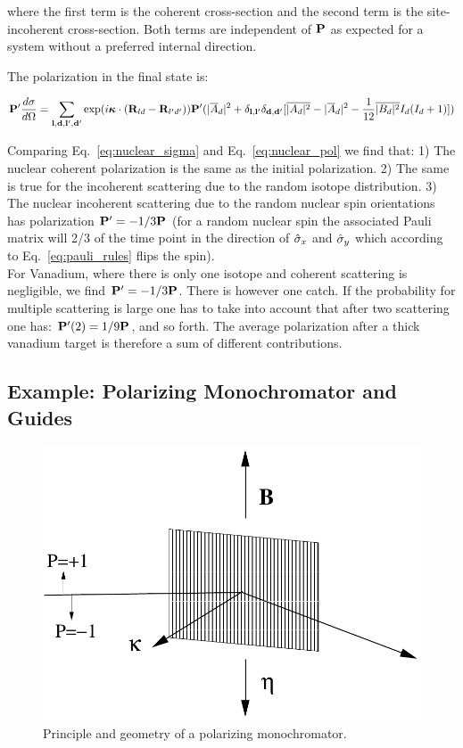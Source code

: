 where the first term is the coherent cross-section and the second term is the
site-incoherent cross-section. Both terms are independent of $\mathbf{P}$ as expected
for a system without a preferred internal direction.

The polarization in the final state is:

\begin{equation}
  \label{eq:nuclear_pol}
  \mathbf{P}' \frac{d\sigma}{d\Omega}  = 
  \sum_{\mathbf{l}, \mathbf{d}, \mathbf{l}', \mathbf{d}'} \exp(i \mathbf{\mbox{\boldmath $\kappa$}} \cdot (\mathbf{R}_{ld}-\mathbf{R}_{l'd'}))
  \mathbf{P}' (|\overline{A}_d|^2 + \delta_{\mathbf{l},\mathbf{l}'}\delta_{\mathbf{d},\mathbf{d}'}[\overline{|A_d|^2} - |\overline{A}_d|^2
  - \frac{1}{12}\overline{|B_d|^2}I_d(I_d+1)])
\end{equation}

Comparing Eq.~\ref{eq:nuclear_sigma} and Eq.~\ref{eq:nuclear_pol} we
find that: 1) The nuclear coherent polarization is the same as the
initial polarization. 2) The same is true for the incoherent
scattering due to the random isotope distribution. 3) The nuclear
incoherent scattering due to the random nuclear spin orientations has
polarization $\mathbf{P}' = -1/3 \mathbf{P}$ (for a random nuclear spin the
associated Pauli matrix will 2/3 of the time point in the direction of
$\hat{\sigma}_x$ and $\hat{\sigma}_y$ which according to
Eq.~\ref{eq:pauli_rules} flips the spin). \\

For Vanadium, where there is only one isotope and coherent scattering
is negligible, we find $\mathbf{P}' = -1/3\mathbf{P}$. There is however one
catch. If the probability for multiple scattering is large one has to
take into account that after two scattering one has: $\mathbf{P}'(2) =
1/9\mathbf{P}$, and so forth. The average polarization after a thick vanadium
target is therefore a sum of different contributions.

\subsection{Example: Polarizing Monochromator and Guides}
\label{sub:mono}

\begin{figure}[htbp]
  \begin{center}
    \includegraphics[keepaspectratio,
    width=0.7\columnwidth]{figures/monochromator_pol}
    \caption{Principle and geometry of a polarizing monochromator.}
    \label{fig:mono_princip}
  \end{center}
\end{figure}

